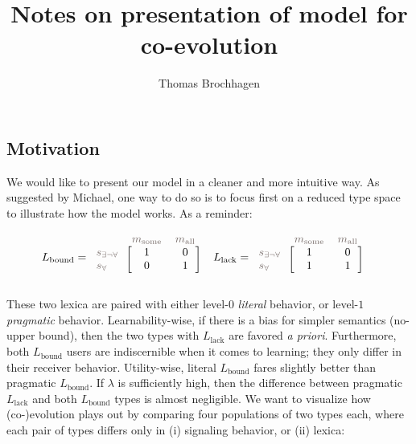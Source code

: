 \documentclass[fleqn,reqno,10pt]{article}
\title{Notes on presentation of model for co-evolution}
\author{Thomas Brochhagen}
\date{}
\newcommand{\mylang}[1]{\ensuremath{L_{\text{#1}}}\xspace} %
\newcommand{\mystate}[1]{\ensuremath{\state_{\text{#1}}}\xspace} %
\newcommand{\mymessg}[1]{\ensuremath{\messg_{\text{#1}}}\xspace} %
\newcommand{\messg}{\ensuremath{m}\xspace}		%
\newcommand{\state}{\ensuremath{s}\xspace}		%
\newcommand{\Lbound}{\mylang{bound}}
\newcommand{\Llack}{\mylang{lack}}
\newcommand{\ssome}{\mystate{\ensuremath{\exists\neg\forall}}}
\newcommand{\sall}{\mystate{\ensuremath{\forall}}}
\newcommand{\msome}{\mymessg{some}}
\newcommand{\mall}{\mymessg{all}}
\newcommand{\mygray}[1]{{\textcolor{mygray}{#1}}}
\begin{document}
\maketitle

\subsection*{Motivation}

We would like to present our model in a cleaner and more intuitive way. As suggested by Michael, one way to do so is to focus first on a reduced type space to illustrate how the model works. As a reminder:

\begin{align*}
  \Lbound & = \begin{blockarray}{lcc}
    & \mygray{\msome} & \mygray{\mall} \\
    \begin{block}{l[cc]}
      \mygray{\ssome} & 1 & 0 \\
      \mygray{\sall}  & 0 & 1 \\
    \end{block}
  \end{blockarray} &
  \Llack & = \begin{blockarray}{lcc}
    & \mygray{\msome} & \mygray{\mall} \\
    \begin{block}{l[cc]}
      \mygray{\ssome} & 1 & 0 \\
      \mygray{\sall}  & 1 & 1 \\
    \end{block}
  \end{blockarray}
\end{align*}

These two lexica are paired with either level-$0$ {\em literal} behavior, or level-$1$ {\em pragmatic} behavior. Learnability-wise, if there is a bias for simpler semantics (no-upper bound), then the two types with $\Llack$ are favored {\em a priori}. Furthermore, both $\Lbound$ users are indiscernible when it comes to learning; they only differ in their receiver behavior. Utility-wise, literal $\Lbound$ fares slightly better than pragmatic $\Lbound$. If $\lambda$ is sufficiently high, then the difference between pragmatic $\Llack$ and both $\Lbound$ types is almost negligible. We want to visualize how (co-)evolution plays out by comparing four populations of two types each, where each pair of types differs only in (i) signaling behavior, or (ii) lexica:
\end{document}
